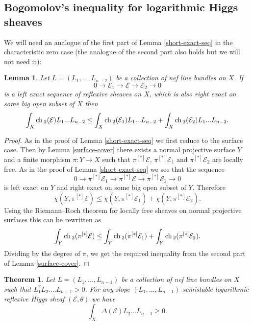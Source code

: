 \documentclass[12pt]{article}
\theoremstyle{plain}
\newtheorem{Theorem}[Thm]{\sc Theorem}
\newtheorem{Lemma}[Thm]{\sc Lemma}
\theoremstyle{definition}
\theoremstyle{remark}
\newcommand{\cE}{{\mathcal E}}
\newcommand{\ch}{{\mathop{\rm ch \, }}}
\begin{document}
\subsection{Bogomolov's inequality for logarithmic Higgs sheaves}

We will need an analogue of the first part of Lemma \ref{short-exact-seq} in the characteristic zero case (the analogue of the second part also holds but we will not need it):

\begin{Lemma}\label{short-exact-seq-0}
Let  $L=(L_1,...,L_{n-2})$ be a collection of nef line bundles on $X$.
If $$0\to \cE_1\to \cE \to \cE_2\to 0$$
is a left exact sequence of reflexive sheaves on $X$, which is also right exact 
on some big open subset of $X$  then
$$\int _X \ch _2 (\cE)L_1...L_{n-2} \le \int _X \ch _2 (\cE _1) L_1...L_{n-2}  +\int _X \ch _2 (\cE _2)L_1...L_{n-2} .$$
\end{Lemma}

\begin{proof}
As in the proof of Lemma \ref{short-exact-seq} we first reduce to the surface case. Then by Lemma \ref{surface-cover} there exists a normal projective surface $Y$ and a finite morphism $\pi: Y\to X$ 
such that  $\pi ^{[*]}\cE$,  $\pi ^{[*]}\cE_1$ and $\pi ^{[*]}\cE _2$ are locally free. 
As in the proof of Lemma \ref{short-exact-seq} we see that the  sequence
$$ 0\to\pi ^{[*]} \cE_1\to\pi ^{[*]} \cE \to\pi ^{[*]} \cE_2\to 0 $$
is  left exact on $Y$ and right exact on some big open subset of $Y$. Therefore
$$\chi(Y,\pi ^{[*]} \cE )\le \chi(Y,\pi ^{[*]} \cE _1)+\chi(Y,\pi ^{[*]} \cE _2).$$
Using the Riemann--Roch theorem for locally free sheaves on normal projective surfaces this can be rewritten as
$$\int _Y \ch _2 (\pi ^{[*]} \cE) \le \int _Y \ch _2 (\pi ^{[*]}\cE _1)  +\int _Y \ch _2 (\pi ^{[*]}\cE _2) .$$
Dividing by the degree of $\pi$, we get  the required inequality from the second part of Lemma \ref{surface-cover}.	
\end{proof}



\begin{Theorem} 
Let  $L=(L_1,...,L_{n-1})$ be a collection of nef line bundles on $X$ such that $L_1^2L_2....L_{n-1}>0$.
For any slope $(L_1,...,L_{n-1})$-semistable logarithmic reflexive Higgs sheaf $(\cE, \theta)$ we have
	$$\int_X \Delta (\cE) L_2...L_{n-1}\ge 0.$$
\end{Theorem}
\end{document}
